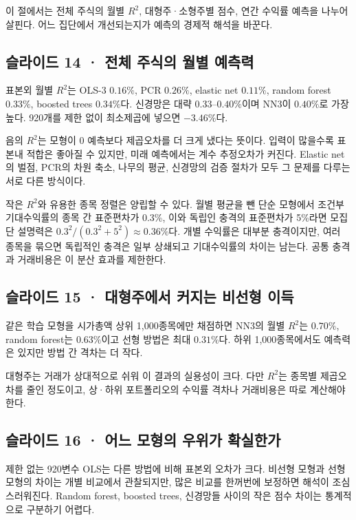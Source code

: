 \documentclass[11pt,a4paper]{article}
\begin{document}
이 절에서는 전체 주식의 월별 $R^2$, 대형주·소형주별 점수, 연간 수익률 예측을 나누어 살핀다. 어느 집단에서 개선되는지가 예측의 경제적 해석을 바꾼다.\par

\subsection{슬라이드 14 · 전체 주식의 월별 예측력}
표본외 월별 $R^2$는 OLS-3 $0.16\%$, PCR $0.26\%$, elastic net $0.11\%$, random forest $0.33\%$, boosted trees $0.34\%$다. 신경망은 대략 $0.33$–$0.40\%$이며 NN3이 $0.40\%$로 가장 높다. 920개를 제한 없이 최소제곱에 넣으면 $-3.46\%$다.\par

음의 $R^2$는 모형이 0 예측보다 제곱오차를 더 크게 냈다는 뜻이다. 입력이 많을수록 표본내 적합은 좋아질 수 있지만, 미래 예측에서는 계수 추정오차가 커진다. Elastic net의 벌점, PCR의 차원 축소, 나무의 평균, 신경망의 검증 절차가 모두 그 문제를 다루는 서로 다른 방식이다.\par

작은 $R^2$와 유용한 종목 정렬은 양립할 수 있다. 월별 평균을 뺀 단순 모형에서 조건부 기대수익률의 종목 간 표준편차가 0.3\%, 이와 독립인 충격의 표준편차가 5\%라면 모집단 설명력은 $0.3^2/(0.3^2+5^2)\approx0.36\%$다. 개별 수익률은 대부분 충격이지만, 여러 종목을 묶으면 독립적인 충격은 일부 상쇄되고 기대수익률의 차이는 남는다. 공통 충격과 거래비용은 이 분산 효과를 제한한다.\par

\subsection{슬라이드 15 · 대형주에서 커지는 비선형 이득}
같은 학습 모형을 시가총액 상위 1,000종목에만 채점하면 NN3의 월별 $R^2$는 $0.70\%$, random forest는 $0.63\%$이고 선형 방법은 최대 $0.31\%$다. 하위 1,000종목에서도 예측력은 있지만 방법 간 격차는 더 작다.\par

대형주는 거래가 상대적으로 쉬워 이 결과의 실용성이 크다. 다만 $R^2$는 종목별 제곱오차를 줄인 정도이고, 상·하위 포트폴리오의 수익률 격차나 거래비용은 따로 계산해야 한다.\par

\subsection{슬라이드 16 · 어느 모형의 우위가 확실한가}
제한 없는 920변수 OLS는 다른 방법에 비해 표본외 오차가 크다. 비선형 모형과 선형 모형의 차이는 개별 비교에서 관찰되지만, 많은 비교를 한꺼번에 보정하면 해석이 조심스러워진다. Random forest, boosted trees, 신경망들 사이의 작은 점수 차이는 통계적으로 구분하기 어렵다.\par
\end{document}
